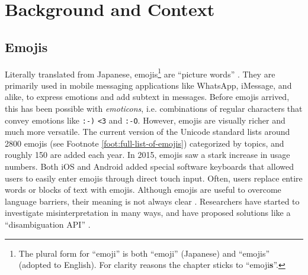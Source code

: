 \section{Background and Context}
\subsection{Emojis}
Literally translated from Japanese, emojis\footnote{The plural form for ``emoji'' is both ``emoji'' (Japanese) and ``emojis'' (adopted to English). For clarity reasons the chapter sticks to ``emoji\textbf{s}''.} are ``picture words'' \cite{Taggart2015NewWords}. They are primarily used in mobile messaging applications like WhatsApp, iMessage, and alike, to express emotions and add subtext in messages. Before emojis arrived, this has been possible with \textit{emoticons}, i.e. combinations of regular characters that convey emotions like \texttt{:-)} \texttt{<3} and \texttt{:-O}. However, emojis are visually richer and much more versatile. The current version of the Unicode standard lists around 2800 emojis (see Footnote \ref{foot:full-list-of-emojis}) categorized by topics, and roughly 150 are added each year. In 2015, emojis saw a stark increase in usage numbers. Both iOS and Android added special software keyboards that allowed users to easily enter emojis through direct touch input. %
Often, users replace entire words or blocks of text with emojis. Although emojis are useful to overcome language barriers, their meaning is not always clear \cite{Miller2015BlissfullyHappyEmoji,Tigwell2016EmojiMisunderstandings}. Researchers have started to investigate misinterpretation in many ways, and have proposed solutions like a ``disambiguation API'' \cite{Wijeratne2010}. 


